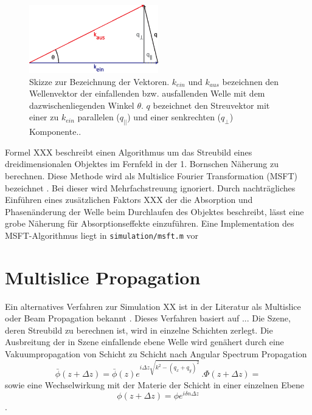 	\begin{figure}
		\centering
		\includegraphics[width=0.5\textwidth]{images/msft.eps}
		\caption[Abbildungstext im Abbildungsverzeichnis]{Skizze zur Bezeichnung der Vektoren. $k_{ein}$ und $k_{aus}$ bezeichnen den Wellenvektor der einfallenden bzw. ausfallenden Welle mit dem dazwischenliegenden Winkel $\theta$. $q$ bezeichnet den Streuvektor mit einer zu $k_{ein}$ parallelen ($q_{||}$) und einer senkrechten ($q_\perp$) Komponente.. }
		\label{Abb:BspAbbildung}
	\end{figure} 

	Formel XXX beschreibt einen Algorithmus um das Streubild eines dreidimensionalen Objektes im Fernfeld in der 1. Bornschen Näherung zu berechnen. Diese Methode wird als Multislice Fourier Transformation (MSFT) bezeichnet \cite{barke2015}. Bei dieser wird Mehrfachstreuung ignoriert. Durch nachträgliches Einführen eines zusätzlichen Faktors XXX der die Absorption und Phasenänderung der Welle beim Durchlaufen des Objektes beschreibt, lässt eine grobe Näherung für Absorptionseffekte einzuführen. Eine Implementation des MSFT-Algorithmus liegt in \texttt{simulation/msft.m} vor 

\section{Multislice Propagation}
	Ein alternatives Verfahren zur Simulation XX ist in der Literatur als Multislice oder Beam Propagation bekannt \cite{hare1994}\cite{cowley1957}. Dieses Verfahren basiert auf ...
	Die Szene, deren Streubild zu berechnen ist, wird in einzelne Schichten zerlegt.
	Die Ausbreitung der in Szene einfallende ebene Welle wird genähert durch eine Vakuumpropagation von Schicht zu Schicht nach Angular Spectrum Propagation
	\begin{equation}
\bar{\phi}\left(z+\Delta z\right)=\bar{\phi}(z)e^{i\Delta z\sqrt{k^2-(q_x+q_y)^2}}\, . 	\Phi(z+\Delta z)=
	\end{equation}
	sowie eine Wechselwirkung mit der Materie der Schicht in einer einzelnen Ebene
	\begin{equation}
		\phi(z+\Delta z)=\phi e^{i\delta n \Delta z}
	\end{equation}.
	
